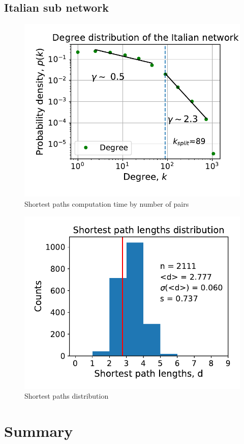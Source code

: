 \documentclass[11pt, twoside]{report}
\begin{document}
\section{Italian sub network}
\begin{minipage}[b]{0.5\textwidth}
   \centering
    \begin{figure}[H]
      \includegraphics[width=\textwidth]{../../scripts/network_analysis/imgs/tot_degree_distribution_ita.pdf}            
          \caption{Shortest paths computation time by number of pairs}
      \label{fig:path_time}
\end{figure}
\end{minipage}
\begin{minipage}[b]{0.5\textwidth}
  \begin{figure}[H]
  \centering
      \includegraphics[width=\textwidth]{../../scripts/network_analysis/imgs/paths_hist_ita.pdf}            
        \caption{Shortest paths distribution}
\end{figure}
\end{minipage}


    

    

    

    \chapter{Summary}


\printbibliography[title={References}]
\end{document}
